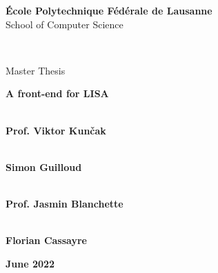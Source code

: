 \begin{center}
{\LARGE \textbf{École Polytechnique Fédérale de Lausanne}} \\
\vspace{0.2cm}
{\Large {School of Computer Science}} \\
\vspace{1cm}

 \\
\vspace{0.8cm}

{\Large {Master Thesis}} \\
\vspace{1cm}

{\LARGE \textbf{A front-end for LISA}} \\
\vspace{1cm}

\end{center}

\begin{multicols}{2}
\hfuzz=10pt %

 \\
\large{\textbf{Prof. Viktor Kunčak}} \\
\vspace{0.1cm}

 \\
\large{\textbf{Simon Guilloud}} \\
\vspace{0.1cm}

 \\
\large{\textbf{Prof. Jasmin Blanchette}} \\
\vspace{0.1cm}
\columnbreak

 \\
\large{\textbf{Florian Cassayre}} \\
\end{multicols}

\vspace{2cm}

\begin{center}
  \large{\textbf{June 2022}}
\end{center}
